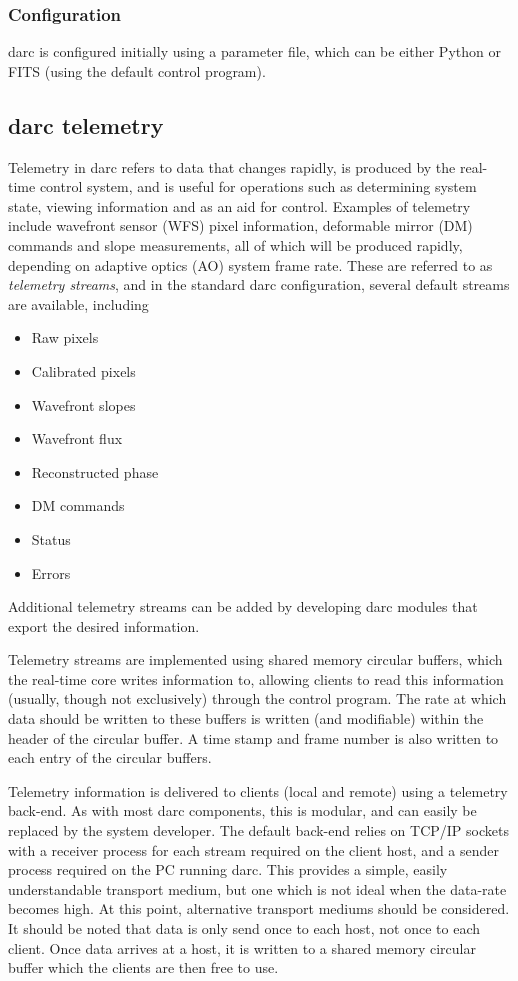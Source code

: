 \documentclass[a4,10pt]{article}
\newcommand{\ao}{adaptive optics (AO)\renewcommand{\ao}{AO\xspace}\xspace}
\newcommand{\dm}{deformable mirror (DM)\renewcommand{\dm}{DM\xspace}\xspace}
\newcommand{\wfs}{wavefront sensor (WFS)\renewcommand{\wfs}{WFS\xspace}\xspace}
\begin{document}
\subsubsection{Configuration}
darc is configured initially using a parameter file, which can be
either Python or FITS (using the default control program).  

\subsection{darc telemetry}
Telemetry in darc refers to data that changes rapidly, is produced by
the real-time control system, and is useful for operations such as
determining system state, viewing information and as an aid for
control.  Examples of telemetry include \wfs pixel information, \dm
commands and slope measurements, all of which will be produced
rapidly, depending on \ao system frame rate.  These are referred to as
{\em telemetry streams}, and in the standard darc configuration,
several default streams are available, including
\begin{itemize}
\item Raw pixels
\item Calibrated pixels
\item Wavefront slopes
\item Wavefront flux
\item Reconstructed phase
\item DM commands
\item Status
\item Errors
\end{itemize}

Additional telemetry streams can be added by developing darc modules
that export the desired information.

Telemetry streams are implemented using shared memory circular
buffers, which the real-time core writes information to, allowing
clients to read this information (usually, though not exclusively)
through the control program.  The rate at which data should be written
to these buffers is written (and modifiable) within the header of the
circular buffer.  A time stamp and frame number is also written to
each entry of the circular buffers.

Telemetry information is delivered to clients (local and remote) using
a telemetry back-end.  As with most darc components, this is modular,
and can easily be replaced by the system developer.  The default
back-end relies on TCP/IP sockets with a receiver process for each
stream required on the client host, and a sender process required on
the PC running darc.  This provides a simple, easily understandable
transport medium, but one which is not ideal when the data-rate
becomes high.  At this point, alternative transport mediums should be
considered.  It should be noted that data is only send once to each
host, not once to each client.  Once data arrives at a host, it is
written to a shared memory circular buffer which the clients are then
free to use.
\end{document}
